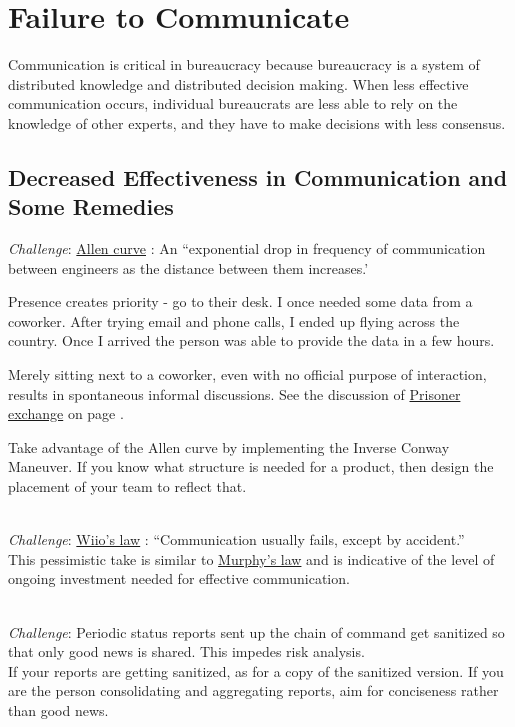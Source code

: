 \section{Failure to Communicate\label{sec:failure-to-comm}}

Communication is critical in bureaucracy because bureaucracy is a system of distributed knowledge and distributed decision making. When less effective communication occurs, individual bureaucrats are less able to rely on the knowledge of other experts, and they have to make decisions with less consensus. 

\subsection*{Decreased Effectiveness in Communication and Some Remedies}

\textit{Challenge}:  \href{https://en.wikipedia.org/wiki/Allen_curve}{Allen curve}
: 
An ``exponential drop in frequency of communication between engineers as the distance between them increases.'

Presence creates priority - go to their desk. I once needed some data from a coworker. After trying email and phone calls, I ended up flying across the country. Once I arrived the person was able to provide the data in a few hours.

Merely sitting next to a coworker, even with no official purpose of interaction, results in spontaneous informal discussions. See the discussion of \hyperref[sec:prisoner-exchange]{Prisoner exchange} on page \pageref{sec:prisoner-exchange}.

Take advantage of the Allen curve by implementing the Inverse Conway Maneuver. If you know what structure is needed for a product, then design the placement of your team to reflect that.

\ \\
\textit{Challenge}: \href{https://en.wikipedia.org/wiki/Wiio\%27s_laws}{Wiio's law}
: 
``Communication usually fails, except by accident.''\\
This pessimistic take is similar to \href{https://en.wikipedia.org/wiki/Murphy\%27s_law}{Murphy's law} and is indicative of the level of ongoing investment needed for effective communication. 

\ \\
\textit{Challenge}: Periodic status reports sent up the chain of command get sanitized so that only good news is shared. This impedes risk analysis. \\
If your reports are getting sanitized, as for a copy of the sanitized version. If you are the person consolidating and aggregating reports, aim for conciseness rather than good news. 

